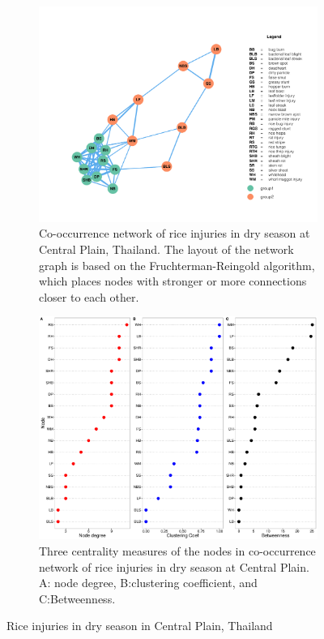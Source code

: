\begin{figure}
    \centering
    \begin{subfigure}[b]{1\textwidth}
        \includegraphics[width = 1\textwidth]{figures/networkCP_ds/networkCP_ds.pdf}
        \caption{Co-occurrence network of rice injuries in dry season at Central Plain, Thailand. The layout of the network graph is based on the Fruchterman-Reingold algorithm, which places nodes with stronger or more connections closer to each other.}
        \label{fig:networkCP_ds}
    \end{subfigure}
    \begin{subfigure}[b]{1\textwidth}
        \includegraphics[width = 1\textwidth]{figures/nodepropCP_ds/nodepropCP_ds.pdf}
        \caption{Three centrality measures of the nodes in co-occurrence network of rice injuries in dry season at Central Plain. A: node degree, B:clustering coefficient, and C:Betweenness.}
        \label{fig:nodepropCP_ds}
    \end{subfigure}
    \caption{Rice injuries in dry season in Central Plain, Thailand}
    \label{fig:CP_ds}
\end{figure}

